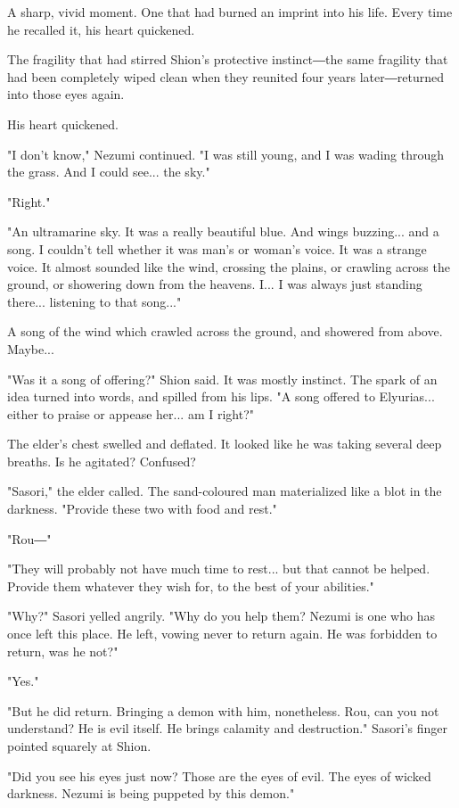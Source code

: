 A sharp, vivid moment. One that had burned an imprint into his life.
Every time he recalled it, his heart quickened.

The fragility that had stirred Shion's protective instinct―the same
fragility that had been completely wiped clean when they reunited four
years later―returned into those eyes again.

His heart quickened.

"I don't know," Nezumi continued. "I was still young, and I was wading
through the grass. And I could see... the sky."

"Right."

"An ultramarine sky. It was a really beautiful blue. And wings
buzzing... and a song. I couldn't tell whether it was man's or woman's
voice. It was a strange voice. It almost sounded like the wind, crossing
the plains, or crawling across the ground, or showering down from the
heavens. I... I was always just standing there... listening to that
song..."

A song of the wind which crawled across the ground, and showered from
above. Maybe...

"Was it a song of offering?" Shion said. It was mostly instinct. The
spark of an idea turned into words, and spilled from his lips. "A song
offered to Elyurias... either to praise or appease her... am I right?"

The elder's chest swelled and deflated. It looked like he was taking
several deep breaths. Is he agitated? Confused?

"Sasori," the elder called. The sand-coloured man materialized like a
blot in the darkness. "Provide these two with food and rest."

"Rou―"

"They will probably not have much time to rest... but that cannot be
helped. Provide them whatever they wish for, to the best of your
abilities."

"Why?" Sasori yelled angrily. "Why do you help them? Nezumi is one who
has once left this place. He left, vowing never to return again. He was
forbidden to return, was he not?"

"Yes."

"But he did return. Bringing a demon with him, nonetheless. Rou, can you
not understand? He is evil itself. He brings calamity and destruction."
Sasori's finger pointed squarely at Shion.

"Did you see his eyes just now? Those are the eyes of evil. The eyes of
wicked darkness. Nezumi is being puppeted by this demon."

